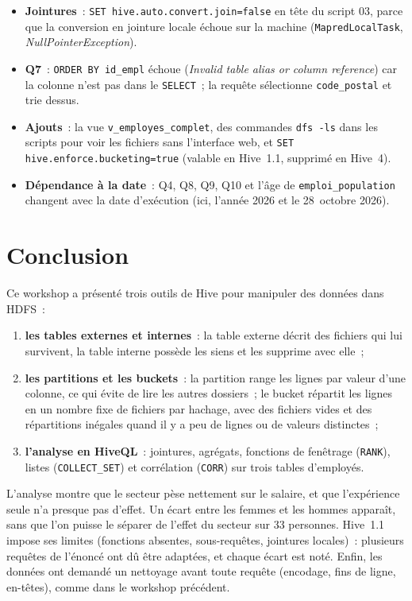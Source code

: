 \begin{itemize}[midpenalty=0, endpenalty=0]
	\item \textbf{Jointures}~: \texttt{SET hive.auto.convert.join=false} en tête du script 03, parce que la conversion en jointure locale échoue sur la machine (\texttt{MapredLocalTask}, \textit{NullPointerException}).
	\item \textbf{Q7}~: \texttt{ORDER BY id\_empl} échoue (\textit{Invalid table alias or column reference}) car la colonne n'est pas dans le \texttt{SELECT}~; la requête sélectionne \texttt{code\_postal} et trie dessus.
	\item \textbf{Ajouts}~: la vue \texttt{v\_employes\_complet}, des commandes \texttt{dfs -ls} dans les scripts pour voir les fichiers sans l'interface web, et \texttt{SET hive.enforce.bucketing=true} (valable en Hive~1.1, supprimé en Hive~4).
	\item \textbf{Dépendance à la date}~: Q4, Q8, Q9, Q10 et l'âge de \texttt{emploi\_population} changent avec la date d'exécution (ici, l'année 2026 et le 28~octobre 2026).
\end{itemize}

\section*{Conclusion}
{}

\noindent Ce workshop a présenté trois outils de Hive pour manipuler des données dans HDFS~:
\begin{enumerate}
	\item \textbf{les tables externes et internes}~: la table externe décrit des fichiers qui lui survivent, la table interne possède les siens et les supprime avec elle~;
	\item \textbf{les partitions et les buckets}~: la partition range les lignes par valeur d'une colonne, ce qui évite de lire les autres dossiers~; le bucket répartit les lignes en un nombre fixe de fichiers par hachage, avec des fichiers vides et des répartitions inégales quand il y a peu de lignes ou de valeurs distinctes~;
	\item \textbf{l'analyse en HiveQL}~: jointures, agrégats, fonctions de fenêtrage (\texttt{RANK}), listes (\texttt{COLLECT\_SET}) et corrélation (\texttt{CORR}) sur trois tables d'employés.
\end{enumerate}

\noindent L'analyse montre que le secteur pèse nettement sur le salaire, et que l'expérience seule n'a presque pas d'effet. Un écart entre les femmes et les hommes apparaît, sans que l'on puisse le séparer de l'effet du secteur sur 33 personnes. Hive~1.1 impose ses limites (fonctions absentes, sous-requêtes, jointures locales)~: plusieurs requêtes de l'énoncé ont dû être adaptées, et chaque écart est noté. Enfin, les données ont demandé un nettoyage avant toute requête (encodage, fins de ligne, en-têtes), comme dans le workshop précédent.
